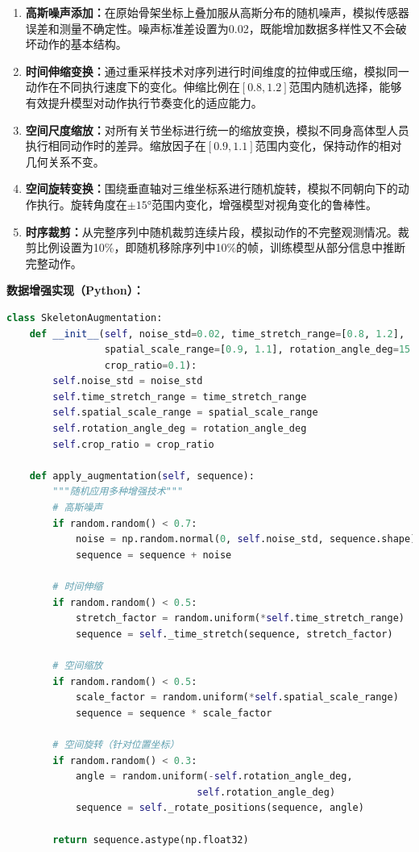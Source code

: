 \documentclass[UTF8]{article}
\begin{document}
\begin{enumerate}
    \item \textbf{高斯噪声添加：}在原始骨架坐标上叠加服从高斯分布的随机噪声，模拟传感器误差和测量不确定性。噪声标准差设置为0.02，既能增加数据多样性又不会破坏动作的基本结构。
    
    \item \textbf{时间伸缩变换：}通过重采样技术对序列进行时间维度的拉伸或压缩，模拟同一动作在不同执行速度下的变化。伸缩比例在$[0.8, 1.2]$范围内随机选择，能够有效提升模型对动作执行节奏变化的适应能力。
    
    \item \textbf{空间尺度缩放：}对所有关节坐标进行统一的缩放变换，模拟不同身高体型人员执行相同动作时的差异。缩放因子在$[0.9, 1.1]$范围内变化，保持动作的相对几何关系不变。
    
    \item \textbf{空间旋转变换：}围绕垂直轴对三维坐标系进行随机旋转，模拟不同朝向下的动作执行。旋转角度在$\pm 15°$范围内变化，增强模型对视角变化的鲁棒性。
    
    \item \textbf{时序裁剪：}从完整序列中随机裁剪连续片段，模拟动作的不完整观测情况。裁剪比例设置为10\%，即随机移除序列中10\%的帧，训练模型从部分信息中推断完整动作。
\end{enumerate}

\vspace{0.5em}
\noindent
\textbf{数据增强实现（Python）：}
\begin{lstlisting}[language=Python, caption={骨架序列数据增强核心代码}]
class SkeletonAugmentation:
    def __init__(self, noise_std=0.02, time_stretch_range=[0.8, 1.2], 
                 spatial_scale_range=[0.9, 1.1], rotation_angle_deg=15.0, 
                 crop_ratio=0.1):
        self.noise_std = noise_std
        self.time_stretch_range = time_stretch_range
        self.spatial_scale_range = spatial_scale_range
        self.rotation_angle_deg = rotation_angle_deg
        self.crop_ratio = crop_ratio
    
    def apply_augmentation(self, sequence):
        """随机应用多种增强技术"""
        # 高斯噪声
        if random.random() < 0.7:
            noise = np.random.normal(0, self.noise_std, sequence.shape)
            sequence = sequence + noise
        
        # 时间伸缩
        if random.random() < 0.5:
            stretch_factor = random.uniform(*self.time_stretch_range)
            sequence = self._time_stretch(sequence, stretch_factor)
        
        # 空间缩放
        if random.random() < 0.5:
            scale_factor = random.uniform(*self.spatial_scale_range)
            sequence = sequence * scale_factor
        
        # 空间旋转（针对位置坐标）
        if random.random() < 0.3:
            angle = random.uniform(-self.rotation_angle_deg, 
                                 self.rotation_angle_deg)
            sequence = self._rotate_positions(sequence, angle)
        
        return sequence.astype(np.float32)
\end{lstlisting}
\end{document}

